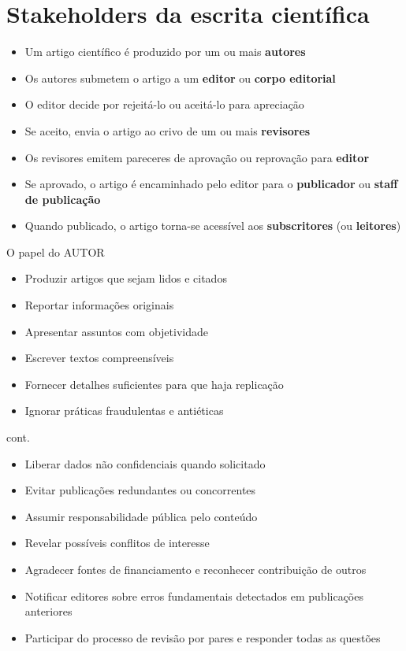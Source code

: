 
\section{Stakeholders da escrita científica}

\begin{frame}
\begin{itemize}
\item Um artigo científico é produzido por um ou mais \textbf{autores} 
\item Os autores submetem o artigo a um \textbf{editor} ou \textbf{corpo editorial}
\item O editor decide por rejeitá-lo ou aceitá-lo para apreciação
\item Se aceito, envia o artigo ao crivo de um ou mais \textbf{revisores} 
\item Os revisores emitem pareceres de aprovação ou reprovação para \textbf{editor}
\item Se aprovado, o artigo é encaminhado pelo editor para o \textbf{publicador} ou \textbf{staff de publicação}
\item Quando publicado, o artigo torna-se acessível aos \textbf{subscritores} (ou \textbf{leitores})
\end{itemize}
\end{frame}

\begin{frame}{O papel do AUTOR} 
\begin{itemize}
\item Produzir artigos que sejam lidos e citados 
\item Reportar informações originais 
\item Apresentar assuntos com objetividade 
\item Escrever textos compreensíveis 
\item Fornecer detalhes suficientes para que haja replicação
\item Ignorar práticas fraudulentas e antiéticas
\end{itemize}
\end{frame}

\begin{frame}{cont.} 
\begin{itemize}
\item Liberar dados não confidenciais quando solicitado
\item Evitar publicações redundantes ou concorrentes
\item Assumir responsabilidade pública pelo conteúdo
\item Revelar possíveis conflitos de interesse
\item Agradecer fontes de financiamento e reconhecer contribuição de outros
\item Notificar editores sobre erros fundamentais detectados em publicações anteriores
\item Participar do processo de revisão por pares e responder todas as questões
\end{itemize}
\end{frame}


